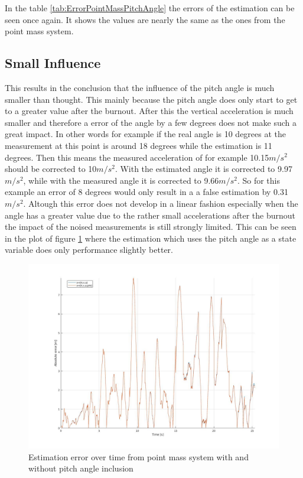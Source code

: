 In the table \ref{tab:ErrorPointMassPitchAngle} the errors of the estimation can be seen once again.
It shows the values are nearly the same as the ones from the point mass system.

\subsection{Small Influence}
This results in the conclusion that the influence of the pitch angle is much smaller than thought.
This mainly because the pitch angle does only start to get to a greater value after the burnout.
After this the vertical acceleration is much smaller and therefore a error of the angle by a few degrees does not make such a great impact.
In other words for example if the real angle is 10 degrees at the measurement at this point is around 18 degrees while the estimation is 11 degrees.
Then this means the measured acceleration of for example 10.15$m/s^2$ should be corrected to 10$m/s^2$. With the estimated angle it is corrected to 9.97$m/s^2$,
while with the measured angle it is corrected to 9.66$m/s^2$. So for this example an error of 8 degrees would only result in a a false estimation by 0.31$m/s^2$.
Altough this error does not develop in a linear fashion especially when the angle has a greater value due to the rather small accelerations after the burnout the impact of the noised measurements is still strongly limited.
This can be seen in the plot of figure \ref{fig:PointMassVSPitch} where the estimation which uses the pitch angle as a state variable does only performance slightly better.
\begin{figure}[h!]
 \centering
 \includegraphics[width=.8 \textwidth]{./Pictures/PointMassVSPitch.jpg}
 \caption{Estimation error over time from point mass system with and without pitch angle inclusion}
 \label{fig:PointMassVSPitch}
\end{figure}

